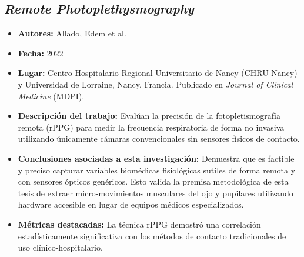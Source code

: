 \subsection{\textit{Remote Photoplethysmography}}
\begin{itemize}
	\item \textbf{Autores:} Allado, Edem et al. \cite{allado2022remote}
	\item \textbf{Fecha:} 2022
	\item \textbf{Lugar:} Centro Hospitalario Regional Universitario de Nancy (CHRU-Nancy) y Universidad de Lorraine, Nancy, Francia. Publicado en \textit{Journal of Clinical Medicine} (MDPI).
	\item \textbf{Descripción del trabajo:} Evalúan la precisión de la fotopletismografía remota (rPPG) para medir la frecuencia respiratoria de forma no invasiva utilizando únicamente cámaras convencionales sin sensores físicos de contacto.
	\item \textbf{Conclusiones asociadas a esta investigación:} Demuestra que es factible y preciso capturar variables biomédicas fisiológicas sutiles de forma remota y con sensores ópticos genéricos. Esto valida la premisa metodológica de esta tesis de extraer micro-movimientos musculares del ojo y pupilares utilizando hardware accesible en lugar de equipos médicos especializados.
	\item \textbf{Métricas destacadas:} La técnica rPPG demostró una correlación estadísticamente significativa con los métodos de contacto tradicionales de uso clínico-hospitalario.
\end{itemize}

